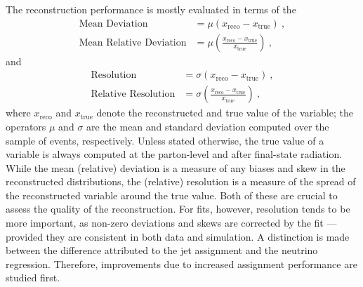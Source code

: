 The reconstruction performance is mostly evaluated in terms of the 
\begin{align}
    \text{Mean Deviation} &=\mu\left(x_{\text{reco}} - x_{\text{true}}\right)~,\\
    \text{Mean Relative Deviation} &=\mu\left(\frac{x_{\text{reco}} -
    x_{\text{true}}}{x_{\text{true}}}\right)~,
\end{align}
and 
\begin{align}
    \text{Resolution}&=\sigma\left(x_{\text{reco}} - x_{\text{true}}\right)~,\\
    \text{Relative Resolution}&=\sigma\left(\frac{x_{\text{reco}} -
    x_{\text{true}}}{x_{\text{true}}}\right)~,
\end{align}
where $x_{\text{reco}}$ and $x_{\text{true}}$ denote the reconstructed and true value of the variable; the operators $\mu$ and $\sigma$ are the mean and standard deviation computed over the sample of events, respectively.
Unless stated otherwise, the true value of a variable is always computed at the parton-level and after final-state radiation.
While the mean (relative) deviation is a measure of any biases and skew in the reconstructed distributions, the (relative) resolution is a measure of the spread of the reconstructed variable around the true value. Both of these are crucial to assess the quality of the reconstruction. For fits, however, resolution tends to be more important, as non-zero deviations and skews are corrected by the fit — provided they are consistent in both data and simulation. A distinction is made between the difference attributed to the jet assignment and the neutrino regression. Therefore, improvements due to increased assignment performance are studied first.

